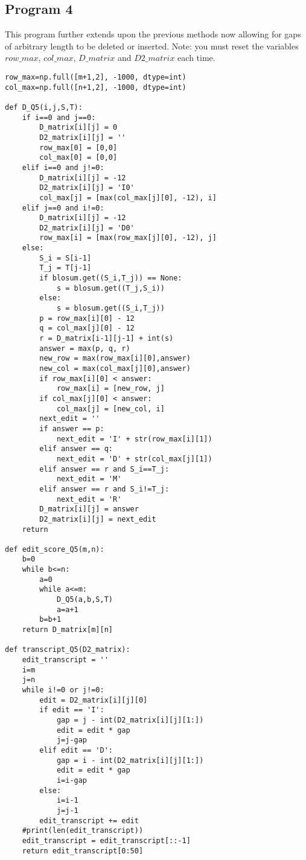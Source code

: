 \documentclass{article}
\begin{document}
\subsection{Program 4}
\vspace{-0.3cm}
\label{subsec:Program 4}
This program further extends upon the previous methods now allowing for gaps of arbitrary length to be deleted or inserted. Note: you must reset the variables $row\_max$, $col\_max$, $D\_matrix$ and $D2\_matrix$ each time.
\begin{lstlisting}
row_max=np.full([m+1,2], -1000, dtype=int)
col_max=np.full([n+1,2], -1000, dtype=int)

def D_Q5(i,j,S,T):
    if i==0 and j==0:
        D_matrix[i][j] = 0
        D2_matrix[i][j] = ''
        row_max[0] = [0,0]
        col_max[0] = [0,0]
    elif i==0 and j!=0:
        D_matrix[i][j] = -12
        D2_matrix[i][j] = 'I0'
        col_max[j] = [max(col_max[j][0], -12), i]
    elif j==0 and i!=0:
        D_matrix[i][j] = -12
        D2_matrix[i][j] = 'D0'
        row_max[i] = [max(row_max[j][0], -12), j]
    else:
        S_i = S[i-1]
        T_j = T[j-1]
        if blosum.get((S_i,T_j)) == None:
            s = blosum.get((T_j,S_i))
        else:
            s = blosum.get((S_i,T_j))
        p = row_max[i][0] - 12
        q = col_max[j][0] - 12
        r = D_matrix[i-1][j-1] + int(s)
        answer = max(p, q, r)
        new_row = max(row_max[i][0],answer)
        new_col = max(col_max[j][0],answer)
        if row_max[i][0] < answer:
            row_max[i] = [new_row, j]
        if col_max[j][0] < answer:
            col_max[j] = [new_col, i]
        next_edit = ''
        if answer == p:
            next_edit = 'I' + str(row_max[i][1])
        elif answer == q:
            next_edit = 'D' + str(col_max[j][1])
        elif answer == r and S_i==T_j:
            next_edit = 'M'
        elif answer == r and S_i!=T_j:
            next_edit = 'R'
        D_matrix[i][j] = answer
        D2_matrix[i][j] = next_edit
    return

def edit_score_Q5(m,n):
    b=0
    while b<=n:
        a=0
        while a<=m:
            D_Q5(a,b,S,T)
            a=a+1
        b=b+1
    return D_matrix[m][n]

def transcript_Q5(D2_matrix):
    edit_transcript = ''
    i=m
    j=n
    while i!=0 or j!=0:
        edit = D2_matrix[i][j][0]
        if edit == 'I':
            gap = j - int(D2_matrix[i][j][1:])
            edit = edit * gap
            j=j-gap
        elif edit == 'D':
            gap = i - int(D2_matrix[i][j][1:])
            edit = edit * gap
            i=i-gap
        else:
            i=i-1
            j=j-1
        edit_transcript += edit
    #print(len(edit_transcript))
    edit_transcript = edit_transcript[::-1]
    return edit_transcript[0:50]
\end{lstlisting}
\vspace{-0.5cm}
\end{document}

